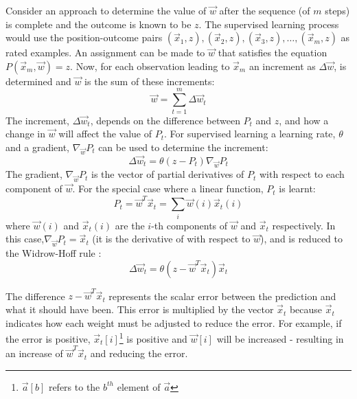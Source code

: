 Consider an approach to determine the value of $\vec{w}$ after  the sequence (of $m$ steps) is complete and the outcome is known to be $z$.  The supervised learning process would use the position-outcome pairs $(\vec{x}_1,z),(\vec{x}_2,z),(\vec{x}_3,z),\ldots,(\vec{x}_m,z)$ as rated examples.  An assignment can be made to $\vec{w}$ that satisfies the equation $P(\vec{x}_m,\vec{w}) = z$.  Now, for each observation leading to $\vec{x}_m$ an increment as $\Delta\vec{w}$, is determined and $\vec{w}$ is the sum of these increments:
\begin{equation}
\label{eq:delta_sum}
\vec{w} = \sum_{t=1}^{m} \Delta \vec{w}_t
\end{equation}
The increment, $\Delta \vec{w}_t$, depends on the difference between $P_t$ and $z$, and how a change in $\vec{w}$ will affect the value of $P_t$.  For supervised learning a learning rate, $\theta$ and a gradient, $\nabla_{\vec{w}} P_t$ can be used to determine the increment:
\begin{equation}
\label{eq:delta}
\Delta \vec{w}_t = \theta(z - P_t) \nabla_{\vec{w}} P_t
\end{equation}
The gradient, $\nabla_{\vec{w}} P_t$ is the vector of partial derivatives of $P_t$ with respect to each component of $\vec{w}$.  For the special case where a linear function, $P_t$ is learnt: 
\begin{equation}
\label{eq:linear}
	P_t = \vec{w}^T \vec{x}_t = \sum_{i} \vec{w}(i) \vec{x}_t(i)
\end{equation}
where 	$\vec{w}(i)$ and $\vec{x}_t(i)$ are the $i$-th components of  $\vec{w}$ and $\vec{x}_t$ respectively.   In this case,$\nabla_{\vec{w}} P_t = \vec{x}_t$ (it is  the derivative of   with respect to $\vec{w}$), and   is reduced to the Widrow-Hoff rule \cite{widrow:circuits}:
\begin{equation}
\label{eq:widrow}
\Delta \vec{w}_t = \theta(z - \vec{w}^T\vec{x}_t) \vec{x}_t
\end{equation}   

The difference $z - \vec{w}^T\vec{x}_t$ represents the scalar error between the prediction and what it should have been.  This error is multiplied by the vector $\vec{x}_t$ because $\vec{x}_t$ indicates how each weight must be adjusted to reduce the error.  For example, if the error is positive, $\vec{x}_t[i]$\footnote{$\vec{a}[b]$ refers to the $b^{th}$ element of $\vec{a}$} is positive and $\vec{w}[i]$ will be increased - resulting in an increase of $\vec{w}^T\vec{x}_t$ and reducing the error.

